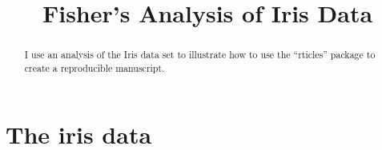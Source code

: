 \documentclass[aoas]{imsart}
\numberwithin{equation}{section}
\theoremstyle{plain}
\theoremstyle{remark}
\begin{document}
\begin{frontmatter}
\title{Fisher's Analysis of Iris Data}


\begin{aug}


\author[A]{ 
  }
  

\address[A]{Department of Biomedical Data Science, Stanford University,
  }
\end{aug}

\begin{abstract}
I use an analysis of the Iris data set to illustrate how to use the
``rticles'' package to create a reproducible manuscript.
\end{abstract}


\begin{keyword}
\end{keyword}

\end{frontmatter}


\hypertarget{the-iris-data}{%
\section{The iris data}\label{the-iris-data}}
\end{document}
